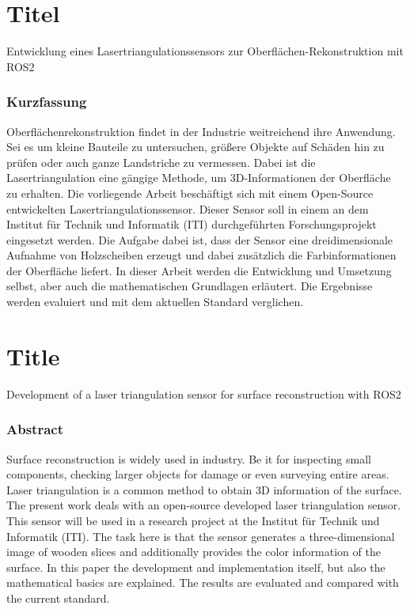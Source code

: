 \section*{Titel}
Entwicklung eines Lasertriangulationssensors zur Oberflächen-Rekonstruktion mit ROS2
\vfill
\subsubsection*{Kurzfassung}

Oberflächenrekonstruktion findet in der Industrie weitreichend ihre Anwendung. Sei es um kleine Bauteile zu untersuchen, größere Objekte auf Schäden hin zu prüfen oder auch ganze Landstriche zu vermessen. Dabei ist die Lasertriangulation eine gängige Methode, um 3D-Informationen der Oberfläche zu erhalten.
Die vorliegende Arbeit beschäftigt sich mit einem Open-Source entwickelten Lasertriangulationssensor. Dieser Sensor soll in einem an dem Institut für Technik und Informatik (ITI) durchgeführten Forschungsprojekt eingesetzt werden. Die Aufgabe dabei ist, dass der Sensor eine dreidimensionale Aufnahme von Holzscheiben erzeugt und dabei zusätzlich die Farbinformationen der Oberfläche liefert. In dieser Arbeit werden die Entwicklung und Umsetzung selbst, aber auch die mathematischen Grundlagen erläutert. Die Ergebnisse werden evaluiert und mit dem aktuellen Standard verglichen.

\section*{Title}
Development of a laser triangulation sensor for surface reconstruction with ROS2

\vfill
\subsubsection*{Abstract}

Surface reconstruction is widely used in industry. Be it for inspecting small components, checking larger objects for damage or even surveying entire areas. Laser triangulation is a common method to obtain 3D information of the surface. The present work deals with an open-source developed laser triangulation sensor. This sensor will be used in a research project at the Institut für Technik und Informatik (ITI). The task here is that the sensor generates a three-dimensional image of wooden slices and additionally provides the color information of the surface. In this paper the development and implementation itself, but also the mathematical basics are explained. The results are evaluated and compared with the current standard.
